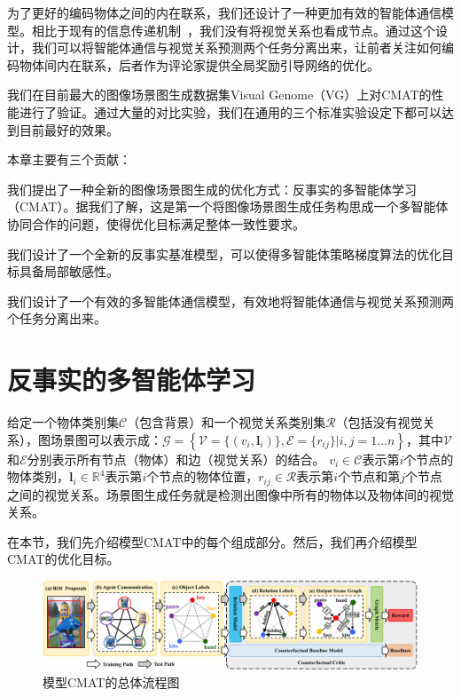 为了更好的编码物体之间的内在联系，我们还设计了一种更加有效的智能体通信模型。相比于现有的信息传递机制~\cite{xu2017scene, li2017scene, jae2018tensorize, li2017vip, yin2018zoom, li2018factorizable}，我们没有将视觉关系也看成节点。通过这个设计，我们可以将智能体通信与视觉关系预测两个任务分离出来，让前者关注如何编码物体间内在联系，后者作为评论家提供全局奖励引导网络的优化。

我们在目前最大的图像场景图生成数据集Visual Genome（VG）上对CMAT的性能进行了验证。通过大量的对比实验，我们在通用的三个标准实验设定下都可以达到目前最好的效果。

本章主要有三个贡献：
\begin{asparaenum}

\item 我们提出了一种全新的图像场景图生成的优化方式：反事实的多智能体学习（CMAT）。据我们了解，这是第一个将图像场景图生成任务构思成一个多智能体协同合作的问题，使得优化目标满足整体一致性要求。

\item 我们设计了一个全新的反事实基准模型，可以使得多智能体策略梯度算法的优化目标具备局部敏感性。

\item 我们设计了一个有效的多智能体通信模型，有效地将智能体通信与视觉关系预测两个任务分离出来。

\end{asparaenum}


\section{反事实的多智能体学习}
给定一个物体类别集$\mathcal{C}$（包含背景）和一个视觉关系类别集$\mathcal{R}$（包括没有视觉关系），图场景图可以表示成：$\mathcal{G} = \left\{ \mathcal{V}=\{(v_i, \bm{l}_i)\},\mathcal{E}=\{r_{ij}\} | i,j = 1...n \right\}$，其中$\mathcal{V}$和$\mathcal{E}$分别表示所有节点（物体）和边（视觉关系）的结合。
$v_i \in \mathcal{C}$表示第$i$个节点的物体类别，$\bm{l}_i \in \mathbb{R}^4$表示第$i$个节点的物体位置，$r_{ij} \in \mathcal{R}$表示第$i$个节点和第$j$个节点之间的视觉关系。场景图生成任务就是检测出图像中所有的物体以及物体间的视觉关系。

在本节，我们先介绍模型CMAT中的每个组成部分。然后，我们再介绍模型CMAT的优化目标。

\begin{figure}[tbp]
    \centering
    \includegraphics[width=\linewidth]{chapter4/res/architecture.pdf}
    \caption{模型CMAT的总体流程图}
    \label{ch4:fig:architecture}
\end{figure}

